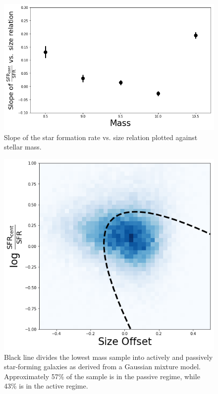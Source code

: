 \documentclass[iop]{emulateapj}
\begin{document}
\begin{figure}
	\centering
	\includegraphics[width= \columnwidth]{slope_cent_excess.png}
	\caption{Slope of the star formation rate vs. size relation plotted against stellar mass.}
	\label{fig:HA_ex_mass}
	
\end{figure}

\begin{figure}
	\centering
	\includegraphics[width=1. \columnwidth]{GMM.png}
	\caption{Black line divides the lowest mass sample into actively and passively star-forming galaxies as derived from a Gaussian mixture model. Approximately 57\% of the sample is in the passive regime, while 43\% is in the active regime.}
	\label{fig:HA_duty}
	
\end{figure}
\end{document}
